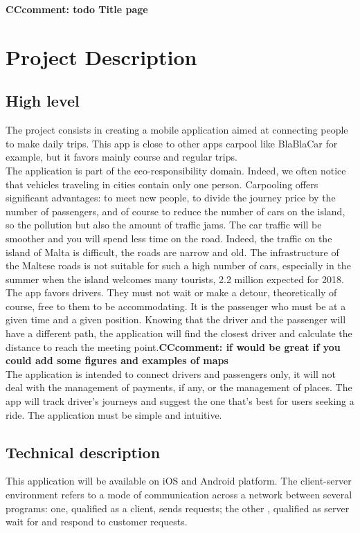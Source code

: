 {\bf CCcomment: todo Title page}

\part{Project Description}

\chapter{High level}
The project consists in creating a mobile application aimed at connecting people to make daily trips. This app is close to other apps carpool like BlaBlaCar for example, but it favors mainly course and regular trips.
\\The application is part of the eco-responsibility domain. Indeed, we often notice that vehicles traveling in cities contain only one person. Carpooling offers significant advantages: to meet new people, to divide the journey price by the number of passengers, and of course to reduce the number of cars on the island, so the pollution but also the amount of traffic jams. The car traffic will be smoother and you will spend less time on the road. Indeed, the traffic on the island of Malta is difficult, the roads are narrow and old. The infrastructure of the Maltese roads is not suitable for such a high number of cars, especially in the summer when the island welcomes many tourists, 2.2 million expected for 2018.
\\The app favors drivers. They must not wait or make a detour, theoretically of course, free to them to be accommodating. It is the passenger who must be at a given time and a given position. Knowing that the driver and the passenger will have a different path, the application will find the closest driver and calculate the distance to reach the meeting point.{\bf CCcomment: if would be great if you could add some figures and examples of maps}
\\The application is intended to connect drivers and passengers only, it will not deal with the management of payments, if any, or the management of places. The app will track driver's journeys and suggest the one that's best for users seeking a ride. The application must be simple and intuitive.

\chapter{Technical description}
This application will be available on iOS and Android platform. The client-server environment refers to a mode of communication across a network between several programs: one, qualified as a client, sends requests; the other , qualified as server wait for and respond to customer requests.

